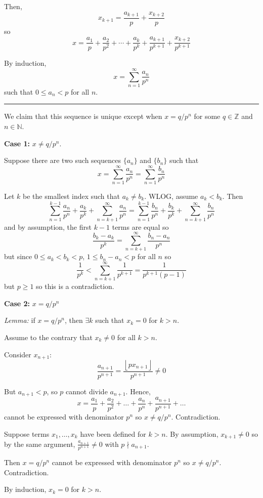 \documentclass[12pt]{article}
\newcommand{\Z}{\mathbb{Z}}
\newcommand{\N}{\mathbb{N}}
\renewcommand{\div}{\vspace*{10pt}\hrule \vspace*{10pt}}
\newcommand{\floor}[1]{\left\lfloor #1 \right\rfloor}
\newenvironment*{proof}[1][blue]{
    \begin{tcolorbox}[
        parbox=false,
        colback=#1!5!white,
        colframe=#1!75!black,
        coltext=#1,
        breakable
    ]}
    {\end{tcolorbox}}
\begin{document}
        Then, 
        \[x_{k+1} = \frac{a_{k+1}}{p} + \frac{x_{k+2}}{p}\]
        so 
        \[x = \frac{a_1}{p} + \frac{a_2}{p^2} + \cdots + \frac{a_k}{p^k} + \frac{a_{k+1}}{p^{k+1}} + \frac{x_{k+2}}{p^{k+1}}\]

        By induction, 
        \[x = \sum_{n=1}^{\infty} \frac{a_n}{p^n}\]
        such that $0 \leq a_n < p$ for all $n$.       

        \div 

        We claim that this sequence is unique except when $x = q/p^n$ for some $q \in \Z$ and $n \in \N$.

        \textbf{Case 1:} $x \neq q/p^n$. 

        Suppose there are two such sequences $\{a_n\}$ and $\{b_n\}$ such that
        \[x = \sum_{n=1}^{\infty} \frac{a_n}{p^n} = \sum_{n=1}^{\infty} \frac{b_n}{p^n}\]

        Let $k$ be the smallest index such that $a_k \neq b_k$. WLOG, assume $a_k < b_k$. Then
        \[\sum_{n=1}^{k-1} \frac{a_n}{p^n} + \frac{a_k}{p^k} + \sum_{n=k+1}^{\infty} \frac{a_n}{p^n} = \sum_{n=1}^{k-1} \frac{b_n}{p^n} + \frac{b_k}{p^k} + \sum_{n=k+1}^{\infty} \frac{b_n}{p^n}\]
        and by assumption, the first $k-1$ terms are equal so 
        \[\frac{b_k - a_k}{p^k} = \sum_{n=k+1}^{\infty} \frac{b_n - a_n}{p^n}\]
        but since $0 \leq a_k < b_k < p$, $1 \leq b_n - a_n < p$ for all $n$ so 
        \[\frac{1}{p^k} < \sum_{n=k+1}^{\infty} \frac{1}{p^{k+1}} = \frac{1}{p^{k+1}(p - 1)}\]
        but $p \geq 1$ so this is a contradiction.

        \textbf{Case 2:} $x = q/p^n$

        \emph{Lemma:} if $x = q/p^n$, then $\exists k$ such that $x_{k} = 0$ for $k > n$. 
        
        \begin{proof}
            Assume to the contrary that $x_k \neq 0$ for all $k > n$. 
            
            Consider $x_{n+1}$: 
            \[\frac{a_{n+1}}{p^{n+1}} = \frac{\floor{px_{n+1}}}{p^{n+1}} \neq 0\]

            But $a_{n+1} < p$, so $p$ cannot divide $a_{n+1}$. Hence, 
            \[x = \frac{a_1}{p} + \frac{a_2}{p^2} + \dots + \frac{a_n}{p^n} + \frac{a_{n+1}}{p^{n+1}} + \dots\] 
            cannot be expressed with denominator $p^n$ so $x \neq q/p^n$. Contradiction. 

            Suppose terms $x_1, \dots, x_k$ have been defined for $k > n$. By assumption, $x_{k+1} \neq 0$ so by the same argument, $\frac{a_{n+1}}{p^{n+1}} \neq 0$ with $p \nmid a_{n+1}$. 

            Then $x = q/p^n$ cannot be expressed with denominator $p^n$ so $x \neq q/p^n$. Contradiction.

            By induction, $x_k = 0$ for $k > n$.
        \end{proof}
\end{document}
